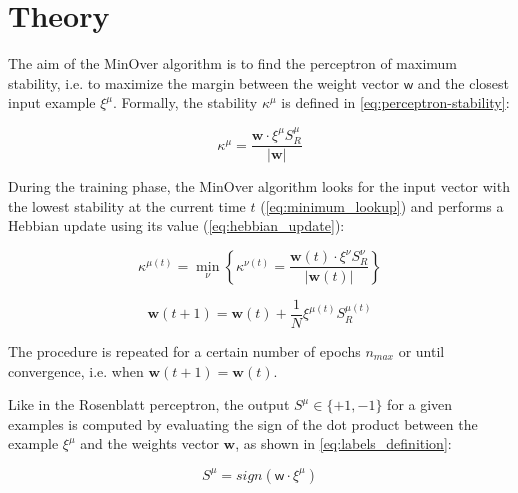 \section{Theory}
\label{sec:theory}

The aim of the MinOver algorithm is to find the perceptron of maximum stability, i.e. to maximize the margin between the weight vector $\bm{\mathsf{w}}$ and the closest input example $\xi^\mu$. Formally, the stability $\kappa^\mu$ is defined in \cref{eq:perceptron-stability}:

\begin{equation}
    \kappa^\mu = \frac{\mathsf{\bm{w}} \cdotp \xi^\mu S^\mu_R}{\lvert \mathsf{\bm{w}} \rvert}
    \label{eq:perceptron-stability}
\end{equation}

During the training phase, the MinOver algorithm looks for the input vector with the lowest stability at the current time $t$ (\cref{eq:minimum_lookup}) and performs a Hebbian update using its value (\cref{eq:hebbian_update}):

\begin{equation}
    \kappa^{\mu(t)} = \min_\nu \left \{ \kappa^{\nu(t)} =  \frac{\mathsf{\bm{w}}(t) \cdotp \xi^\nu S^\nu_R}{\lvert \mathsf{\bm{w}}(t) \rvert} \right \}
    \label{eq:minimum_lookup}
\end{equation}

\begin{equation}
    \mathsf{\bm{w}}(t+1) = \mathsf{\bm{w}}(t) + \frac{1}{N} \xi^{\mu(t)} S^{\mu(t)}_R
    \label{eq:hebbian_update}
\end{equation}

The procedure is repeated for a certain number of epochs $n_{max}$ or until convergence, i.e. when $\mathsf{\bm{w}}(t+1) = \mathsf{\bm{w}}(t)$.

Like in the Rosenblatt perceptron, the output $S^\mu \in \{+1, -1\}$ for a given examples is computed by evaluating the sign of the dot product between the example $\xi^\mu$ and the weights vector $\mathsf{\bm{w}}$, as shown in \cref{eq:labels_definition}:

\begin{equation}
    S^\mu = sign(\mathsf{w} \cdotp \xi^\mu)
    \label{eq:labels_definition}
\end{equation}
